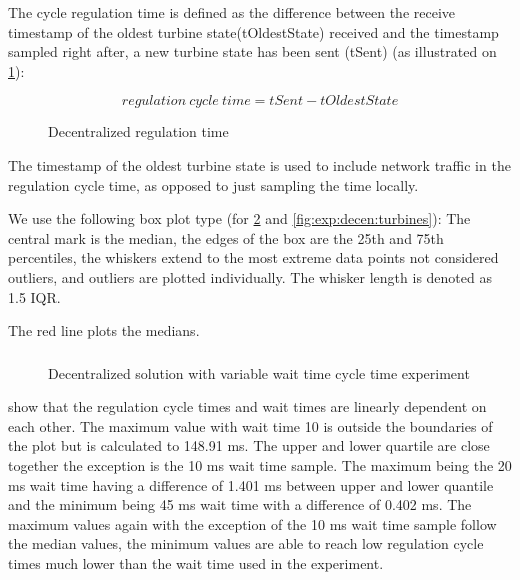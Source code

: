 \label{sec:exp:performance}
The cycle regulation time is defined as the difference between the receive timestamp of the oldest turbine state(tOldestState) received and the timestamp sampled right after, a new turbine state has been sent (tSent) (as illustrated on \cref{fig:timingDecentral}):

$$regulation~cycle~time=tSent-tOldestState$$

\begin{figure}[b]
	
	\caption{Decentralized regulation time}
	\label{fig:timingDecentral}
\end{figure}

The timestamp of the oldest turbine state is used to include network traffic in the regulation cycle time, as opposed to just sampling the time locally.

We use the following box plot type (for \cref{fig:exp:decen:sleep} and \cref{fig:exp:decen:turbines}): The central mark is the median, the edges of the box are the 25th and 75th percentiles, the whiskers extend to the most extreme data points not considered outliers, and outliers are plotted individually. The whisker length is denoted as 1.5 IQR. 

The red line plots the medians.

\subsubsection{}

\begin{figure}[h!]
	\centering
	
	\caption{Decentralized solution with variable wait time cycle time experiment}
	\label{fig:exp:decen:sleep}
\end{figure}

 show that the regulation cycle times and wait times are linearly dependent on each other. The maximum value with wait time 10 is outside the boundaries of the plot but is calculated to 148.91 ms. The upper and lower quartile are close together the exception is the 10 ms wait time sample. The maximum being the 20 ms wait time having a difference of 1.401 ms between upper and lower quantile and the minimum being 45 ms wait time with a difference of 0.402 ms. The maximum values again with the exception of the 10 ms wait time sample follow the median values, the minimum values are able to reach low regulation cycle times much lower than the wait time used in the experiment.


